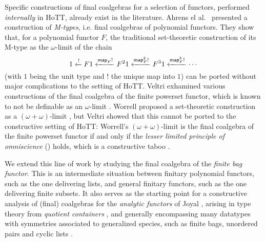 \documentclass[runningheads]{llncs}
\begin{document}
Specific constructions of final coalgebras for a selection of functors, performed \emph{internally} in HoTT, already exist in the literature. Ahrens el al.~\cite{Ahrens2015} presented a construction of \emph{M-types}, i.e. final coalgebras of polynomial functors. They show that, for a polynomial functor $F$, the traditional set-theoretic construction of its M-type as the $\omega$-limit of the chain
\begin{equation}\label{eq:chain}
    1 \xleftarrow{!} {F 1}
      \xleftarrow{\operatorname{\mathsf{map}}_{F} !} {F^2 1}
      \xleftarrow{\operatorname{\mathsf{map}}_{F}^2 !} {F^3 1}
      \xleftarrow{\operatorname{\mathsf{map}}_{F}^3 !}
      \cdots
\end{equation}
(with $1$ being the unit type and $!$ the unique map into $1$) can be ported without major complications to the setting of HoTT. Veltri \cite{Veltri2021} exhamined various constructions of the final coalgebra of the finite powerset functor, which is known to not be definable as an $\omega$-limit \cite{Adamek1995}. Worrell proposed a set-theoretic construction as a $(\omega+\omega)$-limit \cite{Worrell2005}, but Veltri showed that this cannot be ported to the constructive setting of HoTT: Worrell's $(\omega+\omega)$-limit is the final coalgebra of the finite powerset functor if and only if the \emph{lesser limited principle of omniscience} (\LLPO{}) holds, which is a constructive taboo \cite{Bridges1987}.


We extend this line of work by studying the final coalgebra of the \emph{finite bag functor}. This is an intermediate situation between finitary polynomial functors, such as the one delivering lists, and general finitary functors, such as the one delivering finite subsets. It also serves as the starting point for a constructive analysis of (final) coalgebras for the \emph{analytic functors} of Joyal \cite{Joyal1986}, arising in type theory from \emph{quotient containers} \cite{Abbott2004}, and generally encompassing many datatypes with symmetries associated to generalized species, such as finite bags, unordered pairs and cyclic lists \cite{Yorgey2010,Yorgey2014}.
\end{document}
